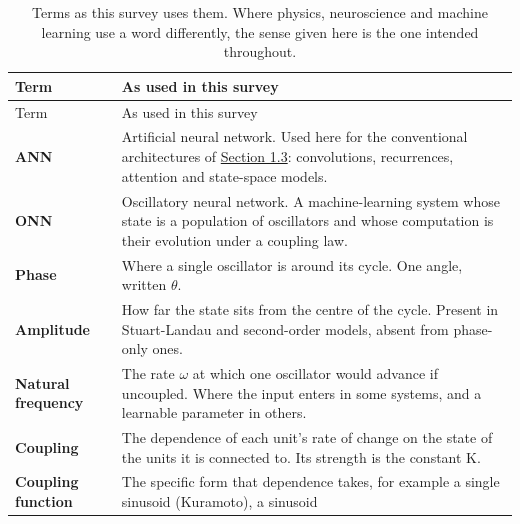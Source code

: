 \documentclass[a4paper,fleqn]{cas-sc}
\begin{document}
\begin{longtable}[]{@{}
  >{\raggedright\arraybackslash}p{}
  >{\raggedright\arraybackslash}p{}@{}}
\caption{Terms as this survey uses them. Where physics, neuroscience and
machine learning use a word differently, the sense given here is the one
intended throughout.}\tabularnewline
\toprule\noalign{}
\begin{minipage}[b]{\linewidth}\raggedright
Term
\end{minipage} & \begin{minipage}[b]{\linewidth}\raggedright
As used in this survey
\end{minipage} \\
\midrule\noalign{}
\endfirsthead
\toprule\noalign{}
\begin{minipage}[b]{\linewidth}\raggedright
Term
\end{minipage} & \begin{minipage}[b]{\linewidth}\raggedright
As used in this survey
\end{minipage} \\
\midrule\noalign{}
\endhead
\bottomrule\noalign{}
\endlastfoot
\textbf{ANN} & Artificial neural network. Used here for the conventional
architectures of \hyperref[sec-1-3]{Section 1.3}: convolutions,
recurrences, attention and state-space models. \\
\cmidrule{1-2}\textbf{ONN} & Oscillatory neural network. A
machine-learning system whose state is a population of oscillators and
whose computation is their evolution under a coupling law. \\
\cmidrule{1-2}\textbf{Phase} & Where a single oscillator is around its
cycle. One angle, written \ensuremath{\theta}. \\
\cmidrule{1-2}\textbf{Amplitude} & How far the state sits from the
centre of the cycle. Present in Stuart-Landau and second-order models,
absent from phase-only ones. \\
\cmidrule{1-2}\textbf{Natural frequency} & The rate \ensuremath{\omega}
at which one oscillator would advance if uncoupled. Where the input
enters in some systems, and a learnable parameter in others. \\
\cmidrule{1-2}\textbf{Coupling} & The dependence of each unit's rate of
change on the state of the units it is connected to. Its strength is the
constant K. \\
\cmidrule{1-2}\textbf{Coupling function} & The specific form that
dependence takes, for example a single sinusoid (Kuramoto), a sinusoid

\end{longtable}
\end{document}
